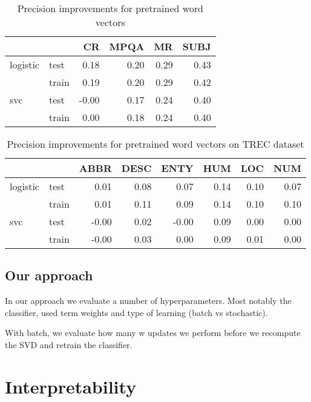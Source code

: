 \begin{table}[H]
\begin{center}

\begin{tabular}{llrrrr}
\toprule
 &&CR &MPQA &MR &SUBJ \\
\midrule
logistic & test & 0.18 & 0.20 & 0.29 & 0.43 \\
 & train & 0.19 & 0.20 & 0.29 & 0.42 \\
svc & test &-0.00 & 0.17 & 0.24 & 0.40 \\
 & train & 0.00 & 0.18 & 0.24 & 0.40 \\
\bottomrule
\end{tabular}

\caption[Precision improvements for pretrained word vectors]{Precision improvements for pretrained word vectors}
\label{tab:}
\end{center}
\end{table}



\begin{table}[H]
\begin{center}

\begin{tabular}{llrrrrrr}
\toprule
 &&ABBR &DESC &ENTY &HUM &LOC &NUM \\
\midrule
logistic & test &0.01 &0.08 &0.07 & 0.14 & 0.10 & 0.07 \\
 & train &0.01 &0.11 &0.09 & 0.14 & 0.10 & 0.10 \\
svc & test & -0.00 &0.02 & -0.00 & 0.09 & 0.00 & 0.00 \\
 & train & -0.00 &0.03 &0.00 & 0.09 & 0.01 & 0.00 \\
\bottomrule
\end{tabular}

\caption[Precision improvements for pretrained word vectors on TREC dataset]{Precision improvements for pretrained word vectors on TREC dataset}
\label{tab:}
\end{center}
\end{table}

    
    \subsection{Our approach}
    
    In our approach we evaluate a number of hyperparameters. Most notably the classifier, used term weights and type of learning (batch vs stochastic).
    
    With batch, we evaluate how many w updates we perform before we recompute the SVD and retrain the classifier.
    

    


\section{Interpretability}
    \cite{ribeiro2016should} %


